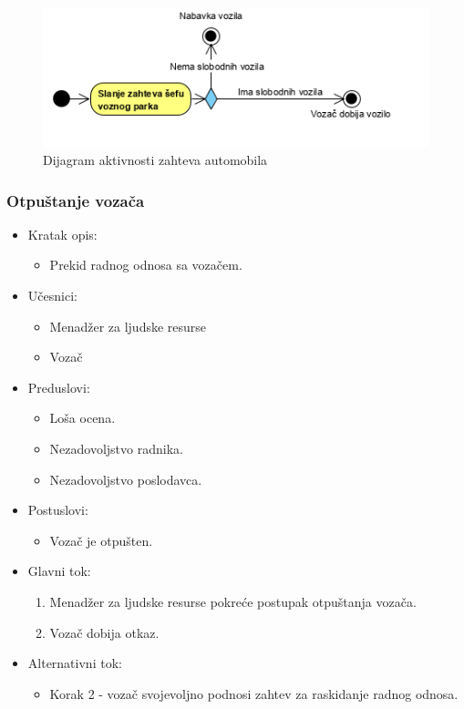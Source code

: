 \begin{figure}[H]
\begin{center}
\includegraphics[scale=1]{Slike/ZahtevAutomobila.png}
\end{center}
    \caption{Dijagram aktivnosti zahteva automobila}
\label{fig:ZahtevAutomobila}
\end{figure}

\subsubsection{\bfseries Otpuštanje vozača}

\begin{itemize}
	\item Kratak opis:
		\begin{itemize}
			\item Prekid radnog odnosa sa vozačem.
		\end{itemize}
	\item Učesnici:
		\begin{itemize}
		    \item Menadžer za ljudske resurse
		    \item Vozač
		\end{itemize}
	\item Preduslovi:
		\begin{itemize}
		    \item Loša ocena.
		    \item Nezadovoljstvo radnika.
		    \item Nezadovoljstvo poslodavca.
		\end{itemize}
	\item Postuslovi:
		\begin{itemize}
			\item Vozač je otpušten.
	    \end{itemize}
	\item Glavni tok:
		\begin{enumerate}
		    \item Menadžer za ljudske resurse pokreće postupak otpuštanja vozača.
		    \item Vozač dobija otkaz.
		\end{enumerate}
	\item Alternativni tok:
		\begin{itemize}
		    \item Korak 2 - vozač svojevoljno podnosi zahtev za raskidanje radnog odnosa.
		\end{itemize}
\end{itemize}

